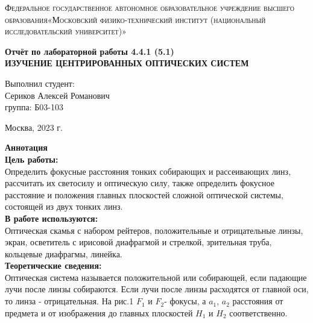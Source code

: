 \documentclass[a4paper, 12pt]{article}%
\begin{document}
	\begin{titlepage}
		\begin{center}
			\textsc{Федеральное государственное автономное образовательное учреждение высшего образования«Московский физико-технический институт (национальный исследовательский университет)»\\[5mm]
			}
			
			\vfill
			
			\textbf{Отчёт по лабораторной работы 4.4.1 (5.1)\\[3mm]
				ИЗУЧЕНИЕ ЦЕНТРИРОВАННЫХ
				ОПТИЧЕСКИХ СИСТЕМ
				\\[50mm]
			}
			
		\end{center}
		
		\hfill
		\begin{minipage}{.5\textwidth}
			Выполнил студент:\\[2mm]
			Сериков Алексей Романович\\[2mm]
			группа: Б03-103\\[5mm]
			
		\end{minipage}
		\vfill
		\begin{center}
			Москва, 2023 г.
		\end{center}
		
	\end{titlepage}
	
	\newpage
	\textbf{Аннотация}\\
	
	
	\textbf{Цель работы: }\\
	
	Определить фокусные расстояния тонких
	собирающих и рассеивающих линз, рассчитать их светосилу и оптическую силу,
	также определить фокусное расстояние и положения главных плоскостей сложной
	оптической системы, состоящей из двух тонких линз.\\
	
	\textbf{В работе используются: }\\
	
	Оптическая скамья с набором рейтеров, положительные
	и отрицательные линзы, экран, осветитель с ирисовой диафрагмой и стрелкой, зрительная труба, кольцевые диафрагмы, линейка.\\
	
	\textbf{Теоретические сведения: } \\
	
	Оптическая система называется положительной или собирающей, если падающие лучи после линзы собираются. Если лучи после линзы расходятся от главной оси, то линза - отрицательная. На рис.1 $F_1$ и $F_2$- фокусы, а $a_1$, $a_2$ расстояния от предмета и от изображения до главных плоскостей $H_1$ и $H_2$ соответственно.    
	
\end{document}
